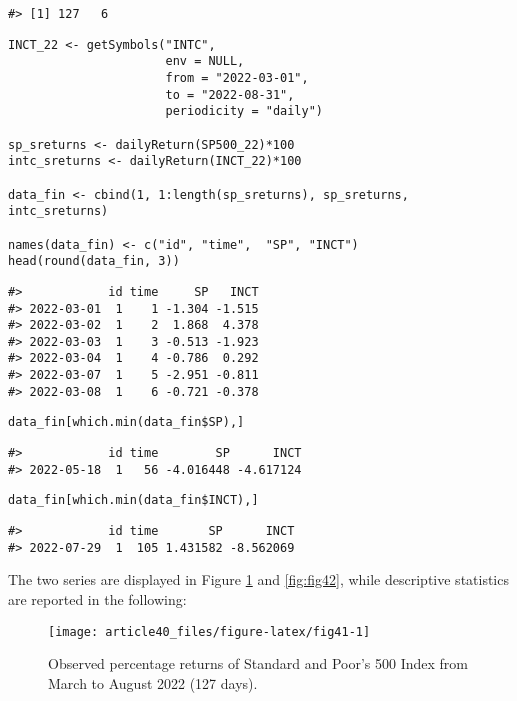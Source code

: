 \begin{verbatim}
#> [1] 127   6
\end{verbatim}

\begin{verbatim}
INCT_22 <- getSymbols("INTC",
                      env = NULL,
                      from = "2022-03-01",
                      to = "2022-08-31",
                      periodicity = "daily")

sp_sreturns <- dailyReturn(SP500_22)*100
intc_sreturns <- dailyReturn(INCT_22)*100

data_fin <- cbind(1, 1:length(sp_sreturns), sp_sreturns, intc_sreturns)

names(data_fin) <- c("id", "time",  "SP", "INCT") 
head(round(data_fin, 3))
\end{verbatim}

\begin{verbatim}
#>            id time     SP   INCT
#> 2022-03-01  1    1 -1.304 -1.515
#> 2022-03-02  1    2  1.868  4.378
#> 2022-03-03  1    3 -0.513 -1.923
#> 2022-03-04  1    4 -0.786  0.292
#> 2022-03-07  1    5 -2.951 -0.811
#> 2022-03-08  1    6 -0.721 -0.378
\end{verbatim}

\begin{verbatim}
data_fin[which.min(data_fin$SP),]
\end{verbatim}

\begin{verbatim}
#>            id time        SP      INCT
#> 2022-05-18  1   56 -4.016448 -4.617124
\end{verbatim}

\begin{verbatim}
data_fin[which.min(data_fin$INCT),]
\end{verbatim}

\begin{verbatim}
#>            id time       SP      INCT
#> 2022-07-29  1  105 1.431582 -8.562069
\end{verbatim}

The two series are displayed in Figure \ref{fig:fig41} and
\ref{fig:fig42}, while descriptive statistics are reported in the
following:

\begin{figure}

{\centering \texttt{[image: article40\_files/figure-latex/fig41-1]} 

}

\caption{Observed percentage returns of Standard and Poor's 500 Index from  March to August 2022 (127 days).}\label{fig:fig41}
\end{figure}

